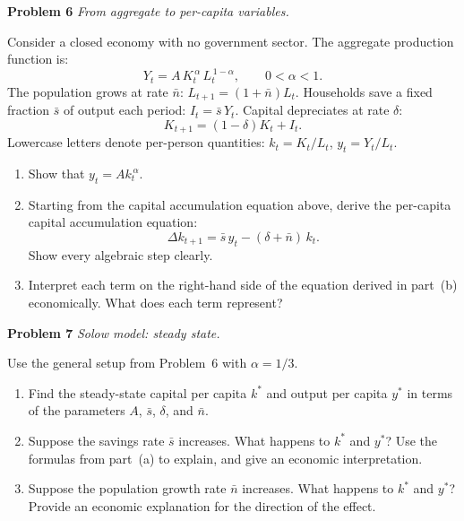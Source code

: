 \documentclass[12pt]{article}
\begin{document}
\bigskip

\noindent\textbf{Problem 6} \quad \textit{From aggregate to per-capita variables.}

\medskip
Consider a closed economy with no government sector.  The aggregate
production function is:
\[
  Y_t = A\,K_t^{\,\alpha}\,L_t^{\,1-\alpha}, \qquad 0 < \alpha < 1.
\]
The population grows at rate $\bar{n}$: $L_{t+1} = (1+\bar{n})L_t$.
Households save a fixed fraction $\bar{s}$ of output each period:
$I_t = \bar{s}\,Y_t$.  Capital depreciates at rate $\delta$:
\[
  K_{t+1} = (1-\delta)K_t + I_t.
\]
Lowercase letters denote per-person quantities: $k_t = K_t/L_t$,
$y_t = Y_t/L_t$.

\begin{enumerate}[label=(\alph*),leftmargin=2em,itemsep=4pt]
  \item Show that $y_t = A k_t^{\,\alpha}$.
  \item Starting from the capital accumulation equation above, derive
        the per-capita capital accumulation equation:
        \[
          \Delta k_{t+1} = \bar{s}\,y_t - (\delta+\bar{n})\,k_t.
        \]
        Show every algebraic step clearly.
  \item Interpret each term on the right-hand side of the equation
        derived in part~(b) economically.  What does each term represent?
\end{enumerate}

\bigskip



\noindent\textbf{Problem 7} \quad \textit{Solow model: steady state.}

\medskip
Use the general setup from Problem~6 with $\alpha = 1/3$.

\begin{enumerate}[label=(\alph*),leftmargin=2em,itemsep=4pt]
  \item Find the steady-state capital per capita $k^*$ and output per
        capita $y^*$ in terms of the parameters $A$, $\bar{s}$, $\delta$,
        and $\bar{n}$.
  \item Suppose the savings rate $\bar{s}$ increases.  What happens to
        $k^*$ and $y^*$?  Use the formulas from part~(a) to explain,
        and give an economic interpretation.
  \item Suppose the population growth rate $\bar{n}$ increases.  What
        happens to $k^*$ and $y^*$?  Provide an economic explanation for
        the direction of the effect.
\end{enumerate}
\end{document}

